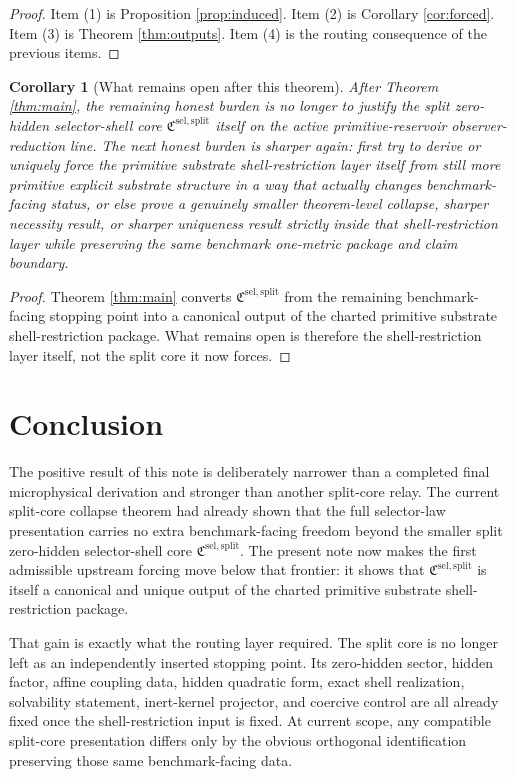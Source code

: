 \documentclass[11pt]{article}
\newcommand{\SelectorCore}{\mathfrak C^{\mathrm{sel,split}}}
\newtheorem{corollary}{Corollary}
\begin{document}
\begin{proof}
Item (1) is Proposition \ref{prop:induced}. Item (2) is Corollary \ref{cor:forced}. Item (3) is Theorem \ref{thm:outputs}. Item (4) is the routing consequence of the previous items.
\end{proof}

\begin{corollary}[What remains open after this theorem]
\label{cor:next}
After Theorem \ref{thm:main}, the remaining honest burden is no longer to justify the split zero-hidden selector-shell core \(\SelectorCore\) itself on the active primitive-reservoir observer-reduction line. The next honest burden is sharper again: first try to derive or uniquely force the primitive substrate shell-restriction layer itself from still more primitive explicit substrate structure in a way that actually changes benchmark-facing status, or else prove a genuinely smaller theorem-level collapse, sharper necessity result, or sharper uniqueness result strictly inside that shell-restriction layer while preserving the same benchmark one-metric package and claim boundary.
\end{corollary}

\begin{proof}
Theorem \ref{thm:main} converts \(\SelectorCore\) from the remaining benchmark-facing stopping point into a canonical output of the charted primitive substrate shell-restriction package. What remains open is therefore the shell-restriction layer itself, not the split core it now forces.
\end{proof}

\section{Conclusion}

The positive result of this note is deliberately narrower than a completed final microphysical derivation and stronger than another split-core relay. The current split-core collapse theorem had already shown that the full selector-law presentation carries no extra benchmark-facing freedom beyond the smaller split zero-hidden selector-shell core \(\SelectorCore\). The present note now makes the first admissible upstream forcing move below that frontier: it shows that \(\SelectorCore\) is itself a canonical and unique output of the charted primitive substrate shell-restriction package.

That gain is exactly what the routing layer required. The split core is no longer left as an independently inserted stopping point. Its zero-hidden sector, hidden factor, affine coupling data, hidden quadratic form, exact shell realization, solvability statement, inert-kernel projector, and coercive control are all already fixed once the shell-restriction input is fixed. At current scope, any compatible split-core presentation differs only by the obvious orthogonal identification preserving those same benchmark-facing data.
\end{document}
